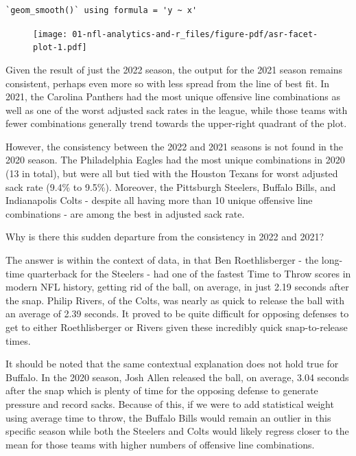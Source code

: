 \documentclass[
  letterpaper,
]{krantz}
\begin{document}
\begin{verbatim}
`geom_smooth()` using formula = 'y ~ x'
\end{verbatim}

\begin{figure}[H]

{\centering \texttt{[image: 01-nfl-analytics-and-r\_files/figure-pdf/asr-facet-plot-1.pdf]}

}

\end{figure}

Given the result of just the 2022 season, the output for the 2021 season
remains consistent, perhaps even more so with less spread from the line
of best fit. In 2021, the Carolina Panthers had the most unique
offensive line combinations as well as one of the worst adjusted sack
rates in the league, while those teams with fewer combinations generally
trend towards the upper-right quadrant of the plot.

However, the consistency between the 2022 and 2021 seasons is not found
in the 2020 season. The Philadelphia Eagles had the most unique
combinations in 2020 (13 in total), but were all but tied with the
Houston Texans for worst adjusted sack rate (9.4\% to 9.5\%). Moreover,
the Pittsburgh Steelers, Buffalo Bills, and Indianapolis Colts - despite
all having more than 10 unique offensive line combinations - are among
the best in adjusted sack rate.

Why is there this sudden departure from the consistency in 2022 and
2021?

The answer is within the context of data, in that Ben Roethlisberger -
the long-time quarterback for the Steelers - had one of the fastest Time
to Throw scores in modern NFL history, getting rid of the ball, on
average, in just 2.19 seconds after the snap. Philip Rivers, of the
Colts, was nearly as quick to release the ball with an average of 2.39
seconds. It proved to be quite difficult for opposing defenses to get to
either Roethlisberger or Rivers given these incredibly quick
snap-to-release times.

It should be noted that the same contextual explanation does not hold
true for Buffalo. In the 2020 season, Josh Allen released the ball, on
average, 3.04 seconds after the snap which is plenty of time for the
opposing defense to generate pressure and record sacks. Because of this,
if we were to add statistical weight using average time to throw, the
Buffalo Bills would remain an outlier in this specific season while both
the Steelers and Colts would likely regress closer to the mean for those
teams with higher numbers of offensive line combinations.
\end{document}
